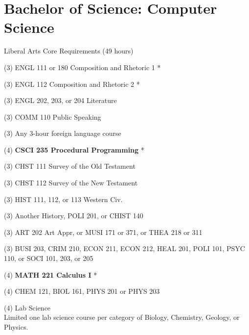 %
\section*{Bachelor of Science: Computer Science}

\begin{reqgroup}{Liberal Arts Core Requirements (49 hours)}
\begin{checklist}
\begin{minipage}[t]{0.5\linewidth}
	\item (3) ENGL 111 or 180 Composition and Rhetoric 1 *
	\item (3) ENGL 112 Composition and Rhetoric 2 *
	\item (3) ENGL 202, 203, or 204 Literature
	\item (3) COMM 110 Public Speaking
	\item (3) Any 3-hour foreign language course
	\item (4) \textbf{CSCI 235  Procedural Programming} *
	\item (3) CHST 111  Survey of the Old Testament
	\item (3) CHST 112  Survey of the New Testament
	\item (3) HIST 111, 112, or 113 Western Civ.
\end{minipage}
\begin{minipage}[t]{0.5\linewidth}
	\item (3)	Another History, POLI 201, or CHIST 140
	\item (3)	ART 202 Art Appr, or MUSI 171 or 371, or THEA 218 or 311
	\item (3)	BUSI 203, CRIM 210, ECON 211, ECON 212, HEAL 201, POLI 101, PSYC 110, or SOCI 101, 203, or 205
	\item (4)	\textbf{MATH 221 Calculus I} *
	\item (4)	CHEM 121, BIOL 161, PHYS 201 or PHYS 203
	\item (4)	Lab Science\\Limited one lab science course per category of Biology, Chemistry,
Geology, or Physics.
\end{minipage}
\end{checklist}
\end{reqgroup}


